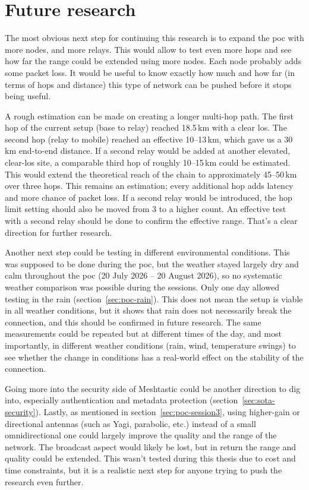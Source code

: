 \section{Future research}%
\label{sec:conclusion-future}

The most obvious next step for continuing this research is to expand the \gls{poc} with more nodes, and more relays. This would allow to test even more hops and see how far the range could be extended using more nodes.
Each node probably adds some packet loss. It would be useful to know exactly how much and how far (in terms of hops and distance) this type of network can be pushed before it stops being useful.

A rough estimation can be made on creating a longer multi-hop path. The first hop of the current setup (base to relay) reached 18.5\,km with a clear \gls{los}. The second hop (relay to mobile) reached an effective 10--13\,km, which gave us a 30\,km end-to-end distance.
If a second relay would be added at another elevated, clear-\gls{los} site, a comparable third hop of roughly 10--15\,km could be estimated. This would extend the theoretical reach of the chain to approximately 45--50\,km over three hops.
This remains an estimation; every additional hop adds latency and more chance of packet loss. If a second relay would be introduced, the hop limit setting should also be moved from 3 to a higher count.
An effective test with a second relay should be done to confirm the effective range. That's a clear direction for further research.

Another next step could be testing in different environmental conditions. This was supposed to be done during the \gls{poc}, but the weather stayed largely dry and calm throughout the \gls{poc} (20 July 2026 – 20 August 2026),
so no systematic weather comparison was possible during the sessions. Only one day allowed testing in the rain (section~\ref{sec:poc-rain}).
This does not mean the setup is viable in all weather conditions, but it shows that rain does not necessarily break the connection, and this should be confirmed in future research.
The same measurements could be repeated but at different times of the day, and most importantly, in different weather conditions (rain, wind, temperature swings) to see whether the change in conditions has a real-world effect on the stability of the connection.

Going more into the security side of Meshtastic could be another direction to dig into, especially authentication and metadata protection (section~\ref{sec:sota-security}).
Lastly, as mentioned in section~\ref{sec:poc-session3}, using higher-gain or directional antennas (such as Yagi, parabolic, etc.) instead of a small omnidirectional one could largely improve the quality and the range of the network. The broadcast aspect would likely be lost, but in return the range and quality could be extended.
This wasn't tested during this thesis due to cost and time constraints, but it is a realistic next step for anyone trying to push the research even further.


